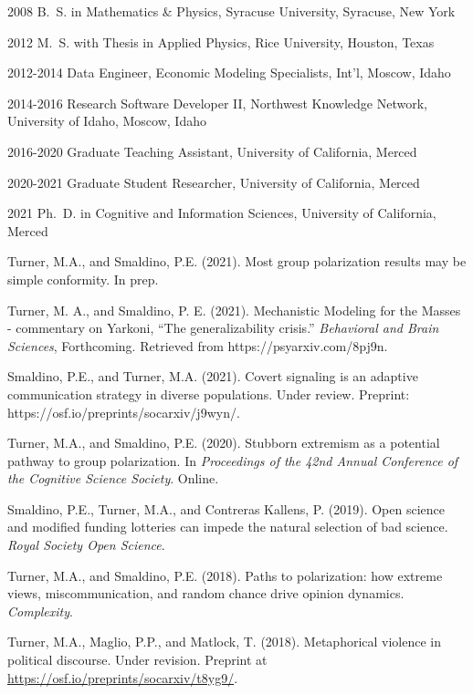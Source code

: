 \documentclass[12pt,chapterheads]{UCMerced}
\begin{document}
\begin{frontmatter}
\begin{vitapage}
\begin{vita}
\item[2008] B.~S. in Mathematics \& Physics, Syracuse University, Syracuse, New York
\item[2012] M.~S. with Thesis in Applied Physics, Rice University, Houston, Texas
\item[2012-2014] Data Engineer, Economic Modeling Specialists, Int'l, Moscow, Idaho
\item[2014-2016] Research Software Developer II, Northwest Knowledge Network, University of Idaho, Moscow, Idaho
  \item[2016-2020] Graduate Teaching Assistant, University of California, Merced
  \item[2020-2021] Graduate Student Researcher,  University of California, Merced
  \item[2021] Ph.~D. in Cognitive and Information Sciences, University of California, Merced
\end{vita}
\begin{publications}
  \item 
    Turner, M.A., and Smaldino, P.E. (2021). Most group polarization results may be simple conformity. In prep.
  \item
  Turner, M. A., and Smaldino, P. E. (2021). Mechanistic Modeling for the Masses - commentary on Yarkoni, “The generalizability crisis.” \emph{Behavioral and Brain Sciences}, Forthcoming. Retrieved from https://psyarxiv.com/8pj9n.
  \item
    Smaldino, P.E., and Turner, M.A. (2021). 
    Covert signaling is an adaptive communication strategy in diverse populations.
  Under review. Preprint: https://osf.io/preprints/socarxiv/j9wyn/.
  \item 
    Turner, M.A., and Smaldino, P.E. (2020).  Stubborn extremism as a potential pathway to group polarization. 
    In \emph{Proceedings of the 42nd Annual Conference of the Cognitive Science Society}. Online.
  \item
    Smaldino, P.E., Turner, M.A., and Contreras Kallens, P. (2019). Open science and modified funding
    lotteries can impede the natural selection of bad science. \emph{Royal Society Open Science}.
  \item 
    Turner, M.A., and Smaldino, P.E. (2018).  Paths to polarization: how extreme views,
    miscommunication, and random chance drive opinion dynamics.  \emph{Complexity}.
  \item 
    Turner, M.A., Maglio, P.P., and Matlock, T. (2018).  Metaphorical violence
    in political discourse. 
    Under revision. Preprint at \url{https://osf.io/preprints/socarxiv/t8yg9/}.
\end{publications}
\end{vitapage}


\end{frontmatter}
\end{document}
